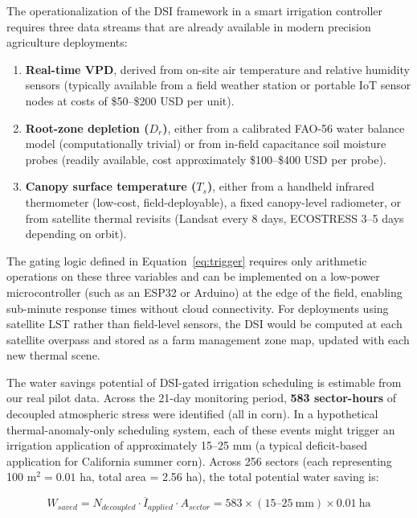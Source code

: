 \documentclass[review,12pt]{elsarticle}
\begin{document}
The operationalization of the DSI framework in a smart irrigation controller requires three data streams that are already available in modern precision agriculture deployments:

\begin{enumerate}
  \item \textbf{Real-time VPD}, derived from on-site air temperature and relative humidity sensors (typically available from a field weather station or portable IoT sensor nodes at costs of \$50--\$200 USD per unit).
  \item \textbf{Root-zone depletion ($D_r$)}, either from a calibrated FAO-56 water balance model (computationally trivial) or from in-field capacitance soil moisture probes (readily available, cost approximately \$100--\$400 USD per probe).
  \item \textbf{Canopy surface temperature ($T_s$)}, either from a handheld infrared thermometer (low-cost, field-deployable), a fixed canopy-level radiometer, or from satellite thermal revisits (Landsat every 8 days, ECOSTRESS 3--5 days depending on orbit).
\end{enumerate}

The gating logic defined in Equation~\ref{eq:trigger} requires only arithmetic operations on these three variables and can be implemented on a low-power microcontroller (such as an ESP32 or Arduino) at the edge of the field, enabling sub-minute response times without cloud connectivity. For deployments using satellite LST rather than field-level sensors, the DSI would be computed at each satellite overpass and stored as a farm management zone map, updated with each new thermal scene.

The water savings potential of DSI-gated irrigation scheduling is estimable from our real pilot data. Across the 21-day monitoring period, \textbf{583 sector-hours} of decoupled atmospheric stress were identified (all in corn). In a hypothetical thermal-anomaly-only scheduling system, each of these events might trigger an irrigation application of approximately 15--25 mm (a typical deficit-based application for California summer corn). Across 256 sectors (each representing 100 m$^2 = 0.01$ ha, total area = 2.56 ha), the total potential water saving is:

\begin{equation}
W_{saved} = N_{decoupled} \cdot \overline{I}_{applied} \cdot A_{sector} = 583 \times (15\text{--}25~\text{mm}) \times 0.01~\text{ha}
\label{eq:water_savings}
\end{equation}
\end{document}
